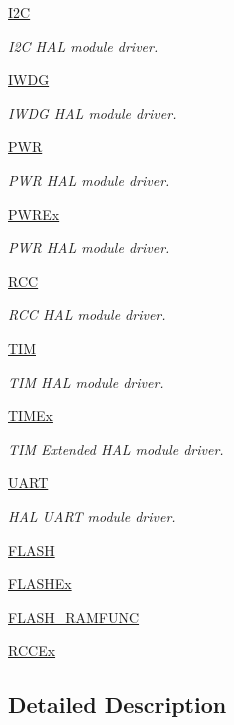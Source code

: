 \begin{DoxyCompactItemize}
\hyperlink{group___i2_c}{I2\-C}
\begin{DoxyCompactList}\small\item\em I2\-C H\-A\-L module driver. \end{DoxyCompactList}\item 
\hyperlink{group___i_w_d_g}{I\-W\-D\-G}
\begin{DoxyCompactList}\small\item\em I\-W\-D\-G H\-A\-L module driver. \end{DoxyCompactList}\item 
\hyperlink{group___p_w_r}{P\-W\-R}
\begin{DoxyCompactList}\small\item\em P\-W\-R H\-A\-L module driver. \end{DoxyCompactList}\item 
\hyperlink{group___p_w_r_ex}{P\-W\-R\-Ex}
\begin{DoxyCompactList}\small\item\em P\-W\-R H\-A\-L module driver. \end{DoxyCompactList}\item 
\hyperlink{group___r_c_c}{R\-C\-C}
\begin{DoxyCompactList}\small\item\em R\-C\-C H\-A\-L module driver. \end{DoxyCompactList}\item 
\hyperlink{group___t_i_m}{T\-I\-M}
\begin{DoxyCompactList}\small\item\em T\-I\-M H\-A\-L module driver. \end{DoxyCompactList}\item 
\hyperlink{group___t_i_m_ex}{T\-I\-M\-Ex}
\begin{DoxyCompactList}\small\item\em T\-I\-M Extended H\-A\-L module driver. \end{DoxyCompactList}\item 
\hyperlink{group___u_a_r_t}{U\-A\-R\-T}
\begin{DoxyCompactList}\small\item\em H\-A\-L U\-A\-R\-T module driver. \end{DoxyCompactList}\item 
\hyperlink{group___f_l_a_s_h}{F\-L\-A\-S\-H}
\item 
\hyperlink{group___f_l_a_s_h_ex}{F\-L\-A\-S\-H\-Ex}
\item 
\hyperlink{group___f_l_a_s_h___r_a_m_f_u_n_c}{F\-L\-A\-S\-H\-\_\-\-R\-A\-M\-F\-U\-N\-C}
\item 
\hyperlink{group___r_c_c_ex}{R\-C\-C\-Ex}
\end{DoxyCompactItemize}


\subsection{Detailed Description}
